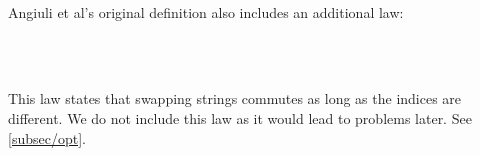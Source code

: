 \begin{code}[hide]%
\>[0]\AgdaSpace{}%
\AgdaSymbol{:}\AgdaSpace{}%
\<%
\\
\>[0]\AgdaSpace{}%
\AgdaSymbol{=}\AgdaSpace{}%
\AgdaSpace{}%
\AgdaSpace{}%
\<%
\end{code}
\begin{code}[hide]%
\>[0]\<%
\end{code}
Angiuli et al's original definition also includes an additional law:
\begin{code}%
\>[0][@{}l@{\AgdaIndent{1}}]%
\>[2]%
\>[175I]\AgdaSymbol{:}%
\>[176I]\AgdaSymbol{(}\AgdaSpace{}%
\AgdaSpace{}%
\AgdaSpace{}%
\AgdaSpace{}%
\AgdaSymbol{:}\AgdaSpace{}%
\AgdaSymbol{)}\AgdaSpace{}%
\AgdaSymbol{(}\AgdaSpace{}%
\AgdaSpace{}%
\AgdaSymbol{:}\AgdaSpace{}%
\AgdaSpace{}%
\AgdaSymbol{)}\AgdaSpace{}%
\AgdaSpace{}%
\AgdaSymbol{(}\AgdaSpace{}%
\AgdaSpace{}%
\AgdaSymbol{)}\AgdaSpace{}%
\<%
\\
\>[.][@{}l@{}]\<[176I]%
\>[10]\AgdaSymbol{(}\AgdaSpace{}%
\AgdaSpace{}%
\AgdaSpace{}%
\AgdaSpace{}%
\AgdaSymbol{)}\AgdaSpace{}%
\AgdaSpace{}%
\AgdaSymbol{(}\AgdaSpace{}%
\AgdaSpace{}%
\AgdaSpace{}%
\AgdaSpace{}%
\AgdaSymbol{)}\<%
\\
\>[.][@{}l@{}]\<[175I]%
\>[8]\AgdaSpace{}%
\AgdaSymbol{(}\AgdaSpace{}%
\AgdaSpace{}%
\AgdaSpace{}%
\AgdaSpace{}%
\AgdaSymbol{)}\AgdaSpace{}%
\AgdaSpace{}%
\AgdaSymbol{(}\AgdaSpace{}%
\AgdaSpace{}%
\AgdaSpace{}%
\AgdaSpace{}%
\AgdaSymbol{)}\<%
\end{code}

This law states that swapping strings commutes as long as the indices are different.
We do not include this law as it would lead to problems later. See \autoref{subsec/opt}.

